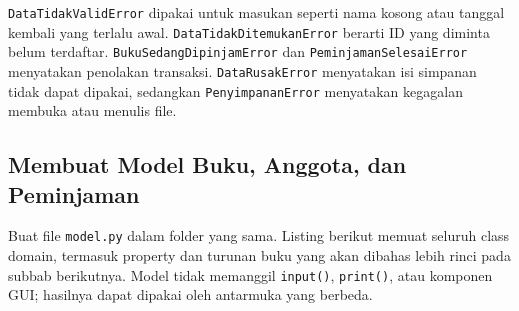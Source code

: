 \texttt{DataTidakValidError} dipakai untuk masukan seperti nama kosong atau tanggal kembali yang terlalu awal. \texttt{DataTidakDitemukanError} berarti ID yang diminta belum terdaftar. \texttt{BukuSedangDipinjamError} dan \texttt{PeminjamanSelesaiError} menyatakan penolakan transaksi. \texttt{DataRusakError} menyatakan isi simpanan tidak dapat dipakai, sedangkan \texttt{PenyimpananError} menyatakan kegagalan membuka atau menulis file.

\subsection{Membuat Model Buku, Anggota, dan Peminjaman}

Buat file \texttt{model.py} dalam folder yang sama. Listing berikut memuat seluruh class domain, termasuk property dan turunan buku yang akan dibahas lebih rinci pada subbab berikutnya. Model tidak memanggil \texttt{input()}, \texttt{print()}, atau komponen GUI; hasilnya dapat dipakai oleh antarmuka yang berbeda.

